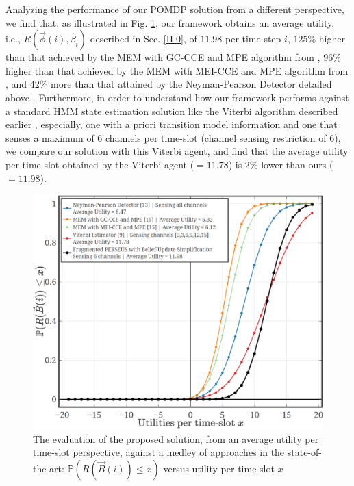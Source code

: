 \documentclass[12pt, draftcls, onecolumn]{IEEEtran}
\begin{document}
Analyzing the performance of our POMDP solution from a different perspective, we find that, as illustrated in Fig. \ref{Fig. 5}, our framework obtains an average utility, i.e., $R(\vec{\phi}(i),\hat{\beta}_{i})$ described in Sec. \ref{II.0}, of $11.98$ per time-step $i$, $125$\% higher than that achieved by the MEM with GC-CCE and MPE algorithm from \cite{WCL:7}, $96$\% higher than that achieved by the MEM with MEI-CCE and MPE algorithm from \cite{WCL:7}, and $42$\% more than that attained by the Neyman-Pearson Detector detailed above \cite{WCL:11}. Furthermore, in order to understand how our framework performs against a standard HMM state estimation solution like the Viterbi algorithm described earlier \cite{WCL:6}, especially, one with a priori transition model information and one that senses a maximum of $6$ channels per time-slot (channel sensing restriction of $6$), we compare our solution with this Viterbi agent, and find that the average utility per time-slot obtained by the Viterbi agent (${=}11.78$) is $2$\% lower than ours (${=}11.98$).
\begin{figure} [t]
    \centerline{
    \includegraphics[width = 1.0\linewidth]{figures/Minerva_SoA_Average_Utility_Performance.png}}
    \vspace{-6mm}
    \caption{The evaluation of the proposed solution, from an average utility per time-slot perspective, against a medley of approaches in the state-of-the-art: $\mathbb{P}(R(\vec{B}(i)){\leq}x)$ versus utility per time-slot $x$}
    \vspace{-7mm}
    \label{Fig. 5}
\end{figure}
\end{document}
